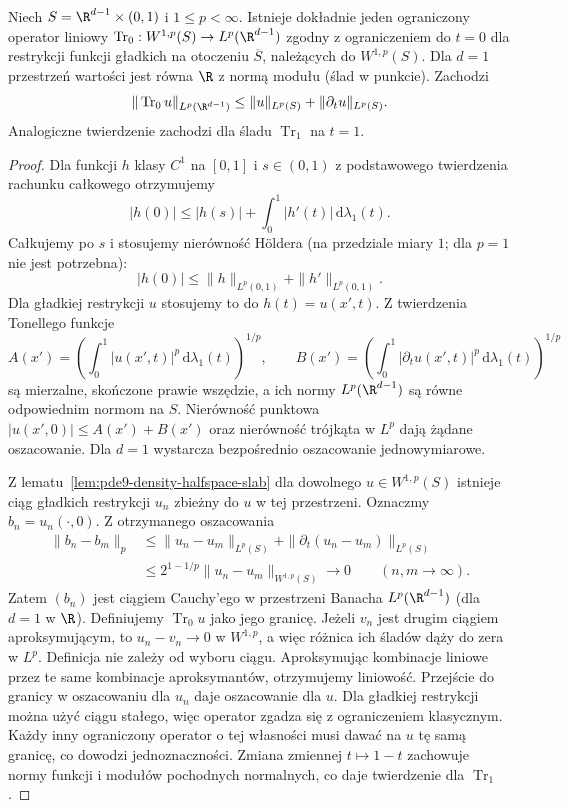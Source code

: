 \begin{twierdzenie}
\label{thm:pde9-trace-slab}
Niech $S=\R^{d-1}\times(0,1)$ i $1\le p<\infty$.
Istnieje dokładnie jeden ograniczony operator liniowy
$\operatorname{Tr}_0:W^{1,p}(S)\to L^p(\R^{d-1})$
zgodny z ograniczeniem do $t=0$ dla restrykcji funkcji
gładkich na otoczeniu $\overline S$, należących do $W^{1,p}(S)$.
Dla $d=1$ przestrzeń wartości jest równa $\R$ z normą
modułu (ślad w punkcie). Zachodzi
\[
 \|\operatorname{Tr}_0u\|_{L^p(\R^{d-1})}
 \le \|u\|_{L^p(S)}+\|\partial_tu\|_{L^p(S)}.
\]
Analogiczne twierdzenie zachodzi dla śladu $\operatorname{Tr}_1$
na $t=1$.
\end{twierdzenie}
\begin{proof}
Dla funkcji $h$ klasy $C^1$ na $[0,1]$ i $s\in(0,1)$
z podstawowego twierdzenia rachunku całkowego otrzymujemy
\[
 |h(0)|\le |h(s)|+\int_0^1|h'(t)|\,\mathrm d\lambda_1(t).
\]
Całkujemy po $s$ i stosujemy nierówność Höldera
(na przedziale miary $1$; dla $p=1$ nie jest potrzebna):
\[
 |h(0)|\le\|h\|_{L^p(0,1)}+\|h'\|_{L^p(0,1)}.
\]
Dla gładkiej restrykcji $u$ stosujemy to do
$h(t)=u(x',t)$. Z twierdzenia Tonellego funkcje
\[
 A(x')=\left(\int_0^1 |u(x',t)|^p\,\mathrm d\lambda_1(t)\right)^{1/p},
 \qquad
 B(x')=\left(\int_0^1 |\partial_tu(x',t)|^p\,\mathrm d\lambda_1(t)\right)^{1/p}
\]
są mierzalne, skończone prawie wszędzie, a ich normy
$L^p(\R^{d-1})$ są równe odpowiednim normom na $S$.
Nierówność punktowa $|u(x',0)|\le A(x')+B(x')$
oraz nierówność trójkąta w $L^p$ dają żądane
oszacowanie. Dla $d=1$ wystarcza bezpośrednio
oszacowanie jednowymiarowe.

Z lematu~\ref{lem:pde9-density-halfspace-slab} dla dowolnego
$u\in W^{1,p}(S)$ istnieje ciąg gładkich restrykcji $u_n$
zbieżny do $u$ w tej przestrzeni. Oznaczmy
$b_n=u_n(\cdot,0)$. Z otrzymanego oszacowania
\[
 \begin{aligned}
 \|b_n-b_m\|_p
 &\le \|u_n-u_m\|_{L^p(S)}
       +\|\partial_t(u_n-u_m)\|_{L^p(S)}\\
 &\le 2^{1-1/p}\|u_n-u_m\|_{W^{1,p}(S)}
 \longrightarrow0\qquad(n,m\to\infty).
 \end{aligned}
\]
Zatem $(b_n)$ jest ciągiem Cauchy'ego
w przestrzeni Banacha $L^p(\R^{d-1})$
(dla $d=1$ w $\R$). Definiujemy $\operatorname{Tr}_0u$
jako jego granicę. Jeżeli $v_n$ jest drugim ciągiem
aproksymującym, to $u_n-v_n\to0$ w $W^{1,p}$, a więc
różnica ich śladów dąży do zera w $L^p$. Definicja
nie zależy od wyboru ciągu. Aproksymując kombinacje
liniowe przez te same kombinacje aproksymantów,
otrzymujemy liniowość. Przejście do granicy w
oszacowaniu dla $u_n$ daje oszacowanie dla $u$.
Dla gładkiej restrykcji można użyć ciągu stałego,
więc operator zgadza się z ograniczeniem klasycznym.
Każdy inny ograniczony operator o tej własności
musi dawać na $u$ tę samą granicę, co dowodzi
jednoznaczności. Zmiana zmiennej $t\mapsto1-t$
zachowuje normy funkcji i modułów pochodnych normalnych,
co daje twierdzenie dla $\operatorname{Tr}_1$.
\end{proof}

